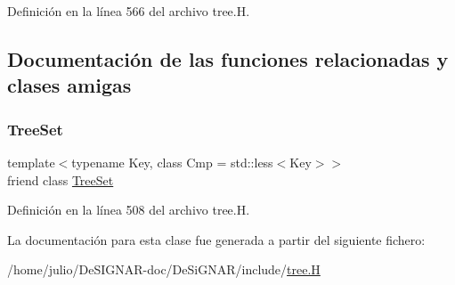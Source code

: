 Definición en la línea 566 del archivo tree.\+H.



\subsection{Documentación de las funciones relacionadas y clases amigas}
\mbox{\label{class_designar_1_1_tree_set_1_1_preorder_iterator_a7caa42294700d2a60905ec3458a7cd8a}} 
\subsubsection{\texorpdfstring{Tree\+Set}{TreeSet}}
{\footnotesize\ttfamily template$<$typename Key, class Cmp = std\+::less$<$\+Key$>$$>$ \\
friend class \hyperlink{class_designar_1_1_tree_set}{Tree\+Set}\hspace{0.3cm}{\ttfamily [friend]}}



Definición en la línea 508 del archivo tree.\+H.



La documentación para esta clase fue generada a partir del siguiente fichero\+:\begin{DoxyCompactItemize}
\item 
/home/julio/\+De\+S\+I\+G\+N\+A\+R-\/doc/\+De\+Si\+G\+N\+A\+R/include/\hyperlink{tree_8_h}{tree.\+H}\end{DoxyCompactItemize}
